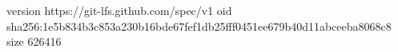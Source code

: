 version https://git-lfs.github.com/spec/v1
oid sha256:1e5b834b3c853a230b16bde67fef1db25fff0451ee679b40d11abceeba8068c8
size 626416
